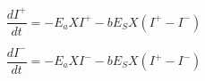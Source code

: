 \begin{equation}
\frac{dI^{+}}{dt}
= -E_aXI^{+} - bE_SX(I^{+} - I^{-})
	\label{eq:two_flux_pos}
\end{equation}

\begin{equation}
\frac{dI^{-}}{dt}
= -E_aXI^{-} - bE_SX(I^{+} - I^{-})
\label{eq:two_flux_neg}
\end{equation}